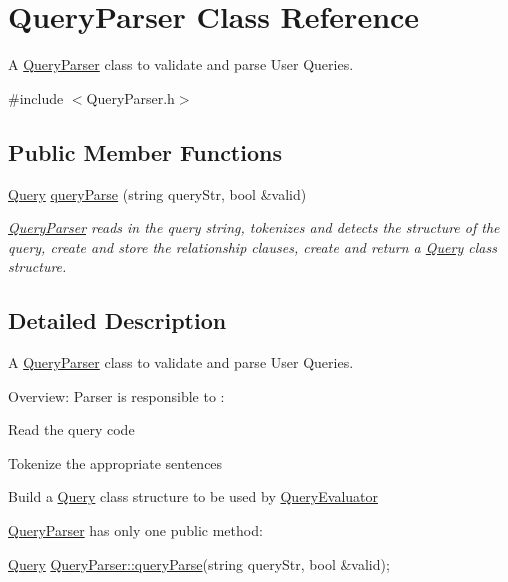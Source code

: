 \hypertarget{class_query_parser}{\section{Query\+Parser Class Reference}
\label{class_query_parser}
}


A \hyperlink{class_query_parser}{Query\+Parser} class to validate and parse User Queries.  




{\ttfamily \#include $<$Query\+Parser.\+h$>$}

\subsection*{Public Member Functions}
\begin{DoxyCompactItemize}
\item 
\hyperlink{class_query}{Query} \hyperlink{class_query_parser_a12db252feb56df9af4bd5fb415cafb99}{query\+Parse} (string query\+Str, bool \&valid)
\begin{DoxyCompactList}\small\item\em \hyperlink{class_query_parser}{Query\+Parser} reads in the query string, tokenizes and detects the structure of the query, create and store the relationship clauses, create and return a \hyperlink{class_query}{Query} class structure. \end{DoxyCompactList}\end{DoxyCompactItemize}


\subsection{Detailed Description}
A \hyperlink{class_query_parser}{Query\+Parser} class to validate and parse User Queries. 

Overview\+: Parser is responsible to \+:
\begin{DoxyItemize}
\item Read the query code
\item Tokenize the appropriate sentences
\item Build a \hyperlink{class_query}{Query} class structure to be used by \hyperlink{class_query_evaluator}{Query\+Evaluator}
\end{DoxyItemize}

\hyperlink{class_query_parser}{Query\+Parser} has only one public method\+: 
\begin{DoxyCode}
\hyperlink{class_query}{Query} \hyperlink{class_query_parser_a12db252feb56df9af4bd5fb415cafb99}{QueryParser::queryParse}(\textcolor{keywordtype}{string} queryStr, \textcolor{keywordtype}{bool} &valid);
\end{DoxyCode}


